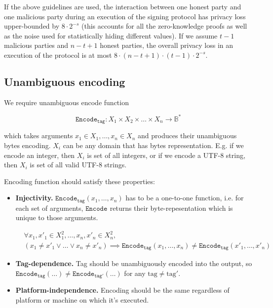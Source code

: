 \documentclass[11pt]{article}
\newcommand{\Encode}[1][]{\ensuremath{\mathtt{Encode}_{\mathtt{#1}}}}
\newcommand{\?}[1]{\stackrel{?}{#1}}
\newcommand{\Byte}{\ensuremath{\mathbb{B}}}
\begin{document}
If the above guidelines are used, 
the interaction between one honest party and one malicious party during an execution of the signing protocol has privacy loss upper-bounded by $8 \cdot 2^{-s}$ (this accounts for all the zero-knowledge proofs as well as the noise used for statistically hiding different values). 
If we assume $t-1$ malicious parties and $n-t+1$ honest parties, the overall privacy loss in an execution of the protocol is at most $8\cdot (n-t+1)\cdot (t-1) \cdot 2^{-s}$.

\subsection{Unambiguous encoding}
We require unambiguous encode function 

$$\Encode[tag] : X_1 \times X_2 \times \dots \times X_n \to \Byte^*$$

which takes arguments $x_1 \in X_1, \dots, x_n \in X_n$ and produces their unambiguous bytes encoding.
$X_i$ can be any domain that has bytes representation. E.g. if we encode an integer, then $X_i$ is set
of all integers, or if we encode a UTF-8 string, then $X_i$ is set of all valid UTF-8 strings.

Encoding function should satisfy these properties:
\begin{itemize}
\item {\bf Injectivity.} $\Encode[tag](x_1, \dots, x_n)$ has to be a one-to-one function, i.e. for each
    set of arguments, $\Encode$ returns their byte-repesentation which is unique to those arguments.

    \begin{equation*}
    \begin{split}
    & \forall x_1,x'_1 \in X_1^2, \dots, x_n,x'_n \in X_n^2, \\
    & (x_1 \ne x'_1 \lor \dots \lor x_n \ne x'_n) \implies
      \Encode[tag](x_1, \dots, x_n) \ne \Encode[tag](x'_1, \dots, x'_n)
    \end{split}
    \end{equation*}
\item {\bf Tag-dependence.} Tag should be unambiguously encoded into the output, so
    $\Encode[tag](\dots) \ne \Encode[tag'](\dots)$ for any $\text{tag} \ne \text{tag}'$. 
\item {\bf Platform-independence.} Encoding should be the same regardless of platform or machine on which it's
    executed.
\end{itemize}
\end{document}
